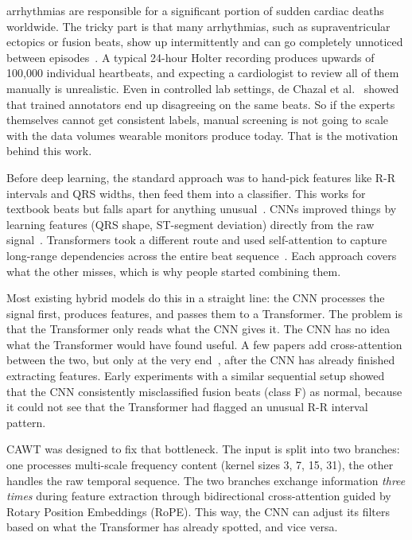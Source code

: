 \documentclass[conference]{IEEEtran}
\begin{document}
 arrhythmias are responsible for a significant portion of sudden cardiac deaths worldwide. The tricky part is that many arrhythmias, such as supraventricular ectopics or fusion beats, show up intermittently and can go completely unnoticed between episodes~\cite{kreatsoulas2010, joshi2008}. A typical 24-hour Holter recording produces upwards of 100,000 individual heartbeats, and expecting a cardiologist to review all of them manually is unrealistic. Even in controlled lab settings, de Chazal et al.~\cite{dechazal2004} showed that trained annotators end up disagreeing on the same beats. So if the experts themselves cannot get consistent labels, manual screening is not going to scale with the data volumes wearable monitors produce today. That is the motivation behind this work.
 
Before deep learning, the standard approach was to hand-pick features like R-R intervals and QRS widths, then feed them into a classifier. This works for textbook beats but falls apart for anything unusual~\cite{singh2022}. CNNs improved things by learning features (QRS shape, ST-segment deviation) directly from the raw signal~\cite{abdelminaam2022}. Transformers took a different route and used self-attention to capture long-range dependencies across the entire beat sequence~\cite{vaswani2017, kim2025, dhara2025}. Each approach covers what the other misses, which is why people started combining them.
 
Most existing hybrid models do this in a straight line: the CNN processes the signal first, produces features, and passes them to a Transformer. The problem is that the Transformer only reads what the CNN gives it. The CNN has no idea what the Transformer would have found useful. A few papers add cross-attention between the two, but only at the very end~\cite{hu2022, lee2024}, after the CNN has already finished extracting features. Early experiments with a similar sequential setup showed that the CNN consistently misclassified fusion beats (class F) as normal, because it could not see that the Transformer had flagged an unusual R-R interval pattern.
 
CAWT was designed to fix that bottleneck. The input is split into two branches: one processes multi-scale frequency content (kernel sizes 3, 7, 15, 31), the other handles the raw temporal sequence. The two branches exchange information \emph{three times} during feature extraction through bidirectional cross-attention guided by Rotary Position Embeddings (RoPE). This way, the CNN can adjust its filters based on what the Transformer has already spotted, and vice versa.
 
\end{document}
